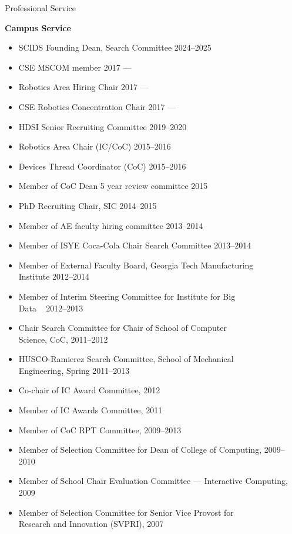 \documentclass{article}
\begin{document}
\begin{cv}
\begin{cvlist}{Professional Service}
		\item {\bf Campus Service}
		\begin{itemize}
			\item SCIDS Founding Dean, Search Committee \cftdotfill{\cftdotsep} 2024--2025
			\item CSE MSCOM member \cftdotfill{\cftdotsep} 2017 ---
			\item Robotics Area Hiring Chair \cftdotfill{\cftdotsep} 2017 ---
			\item CSE Robotics Concentration Chair \cftdotfill{\cftdotsep}
			      2017 ---
			\item HDSI Senior Recruiting Committee  \cftdotfill{\cftdotsep} 2019--2020
			\item Robotics Area Chair (IC/CoC) \cftdotfill{\cftdotsep} 2015--2016
			\item Devices Thread Coordinator (CoC) \cftdotfill{\cftdotsep} 2015--2016
			\item Member of CoC Dean 5 year review committee
			      \cftdotfill{\cftdotsep} 2015
			\item PhD Recruiting Chair, SIC \cftdotfill{\cftdotsep} 2014--2015
			\item Member of AE faculty hiring committee \cftdotfill{\cftdotsep}
			      2013--2014
			\item Member of ISYE Coca-Cola Chair Search Committee
			      \cftdotfill{\cftdotsep} 2013--2014
			\item Member of External Faculty Board, Georgia Tech Manufacturing\\
			      Institute \cftdotfill{\cftdotsep} 2012--2014
			\item Member of Interim Steering Committee for Institute for Big
			      \\Data \ \cftdotfill{\cftdotsep} 2012--2013
			\item Chair Search Committee for Chair of School of Computer\\
			      Science, CoC, \cftdotfill{\cftdotsep} 2011--2012
			\item HUSCO-Ramierez Search Committee, School of Mechanical\\
			      Engineering, Spring \cftdotfill{\cftdotsep} 2011--2013
			\item Co-chair of IC Award Committee, \cftdotfill{\cftdotsep} 2012
			\item Member of IC Awards Committee, \cftdotfill{\cftdotsep} 2011
			\item Member of CoC RPT Committee, \cftdotfill{\cftdotsep} 2009--2013
			\item Member of Selection Committee for Dean of College of
			      Computing, \cftdotfill{\cftdotsep} 2009--2010
			\item Member of School Chair Evaluation Committee --- Interactive
			      Computing, \cftdotfill{\cftdotsep} 2009
			\item Member of Selection Committee for Senior Vice Provost for \\
			      Research and Innovation (SVPRI), \cftdotfill{\cftdotsep} 2007
		\end{itemize}


\end{cvlist}
\end{cv}
\end{document}
